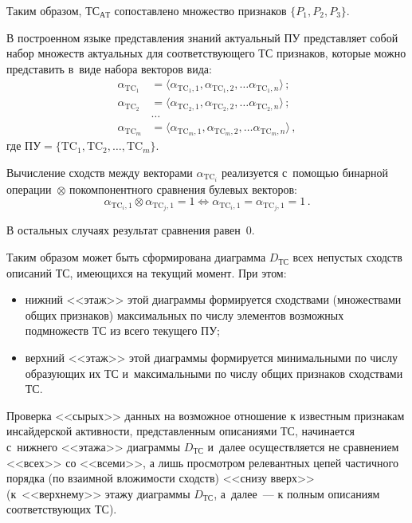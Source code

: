 \begin{multicols}{2}
  Таким образом, ТС$_{\mathrm{АТ}}$ сопоставлено множество признаков $\{ 
P_1, P_2, P_3\}$. 
  
  В построенном языке представления знаний актуальный ПУ представляет 
собой набор множеств актуальных для соответствующего ТС признаков, 
которые можно представить в~виде набора векторов вида:
  \begin{align*}
  \alpha_{\mathrm{TC}_1} &=\langle \alpha_{\mathrm{TC}_1,1},  
\alpha_{\mathrm{TC}_1,2}, \ldots \alpha_{\mathrm{TC}_1,n}\rangle\,;\\
  \alpha_{\mathrm{TC}_2} &=\langle \alpha_{\mathrm{TC}_2,1},  
\alpha_{\mathrm{TC}_2,2}, \ldots \alpha_{\mathrm{TC}_2,n}\rangle\,;\\
  &\ldots\\
  \alpha_{\mathrm{TC}_m} &=\langle \alpha_{\mathrm{TC}_m,1},  
\alpha_{\mathrm{TC}_m,2}, \ldots \alpha_{\mathrm{TC}_m,n}\rangle\,,
  \end{align*}
где $\mathrm{ПУ}=\{\mathrm{TC}_1, \mathrm{TC}_2, \ldots , \mathrm{TC}_m\}$.
  
  Вычисление сходств между векторами $\alpha_{\mathrm{TC}_i}$ 
реализуется с~помощью бинарной операции~$\otimes$ покомпонентного 
сравнения булевых векторов:
  $$
  \alpha_{\mathrm{TC}_i,1}\otimes \alpha_{\mathrm{TC}_j,1} =1\Leftrightarrow 
\alpha_{\mathrm{TC}_i,1}= \alpha_{\mathrm{TC}_j,1}=1\,.
  $$
  
  В остальных случаях результат сравнения равен~0.
  
  Таким образом может быть сформирована диаграмма $D_{\mathrm{ТС}}$ 
всех непустых сходств описаний ТС, имеющихся на текущий момент. При 
этом:
  \begin{itemize}
\item нижний <<этаж>> этой диаграммы формируется сходствами 
(множествами общих признаков) максимальных по числу элементов 
возможных подмножеств ТС из всего текущего ПУ; 
\item верхний <<этаж>> этой диаграммы формируется минимальными по 
числу образующих их ТС и~максимальными по числу общих признаков 
сходствами ТС.
\end{itemize}

  Проверка <<сырых>> данных на возможное отношение к известным 
признакам инсайдерской активности, представленным описаниями ТС, 
начинается с~нижнего <<этажа>> диаграммы $D_{\mathrm{ТС}}$ и~далее 
осуществляется не сравнением <<всех>> со <<всеми>>, а лишь просмотром 
релевантных цепей частичного порядка (по взаимной вложимости сходств) 
<<снизу вверх>> (к~<<верхнему>> этажу диаграммы $D_{\mathrm{ТС}}$, 
а~далее~--- к полным описаниям соответствующих ТС). 
  

\end{multicols}
